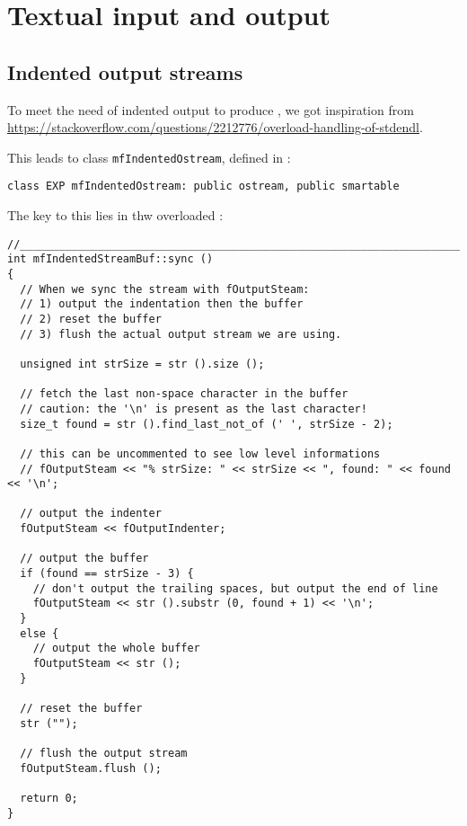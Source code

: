 
\chapter{Textual input and output}



\section{Indented output streams}

To meet the need of indented output to produce , we got inspiration from \url{https://stackoverflow.com/questions/2212776/overload-handling-of-stdendl}.

This leads to class {\tt mfIndentedOstream}, defined in :
\begin{lstlisting}[language=CPlusPlus]
class EXP mfIndentedOstream: public ostream, public smartable
\end{lstlisting}

The key to this lies in thw overloaded :
\begin{lstlisting}[language=CPlusPlus]
//______________________________________________________________________________
int mfIndentedStreamBuf::sync ()
{
  // When we sync the stream with fOutputSteam:
  // 1) output the indentation then the buffer
  // 2) reset the buffer
  // 3) flush the actual output stream we are using.

  unsigned int strSize = str ().size ();

  // fetch the last non-space character in the buffer
  // caution: the '\n' is present as the last character!
  size_t found = str ().find_last_not_of (' ', strSize - 2);

  // this can be uncommented to see low level informations
  // fOutputSteam << "% strSize: " << strSize << ", found: " << found << '\n';

  // output the indenter
  fOutputSteam << fOutputIndenter;

  // output the buffer
  if (found == strSize - 3) {
    // don't output the trailing spaces, but output the end of line
    fOutputSteam << str ().substr (0, found + 1) << '\n';
  }
  else {
    // output the whole buffer
    fOutputSteam << str ();
  }

  // reset the buffer
  str ("");

  // flush the output stream
  fOutputSteam.flush ();

  return 0;
}
\end{lstlisting}

